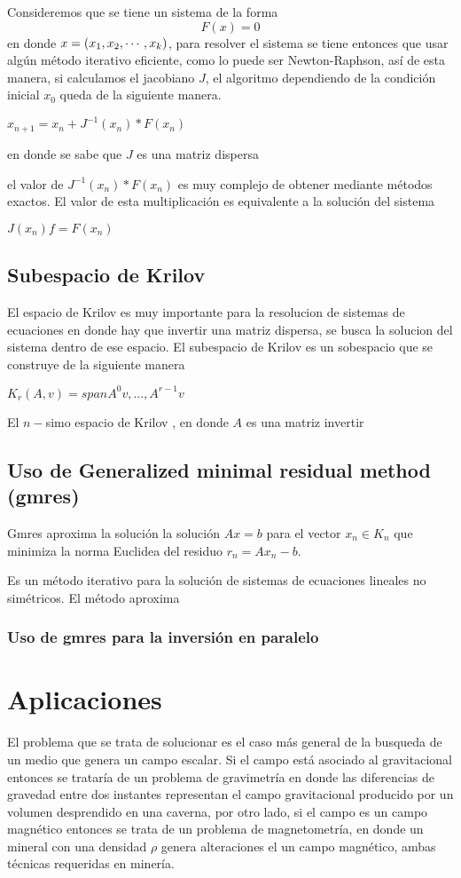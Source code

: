 Consideremos que se tiene un sistema de la forma $$F(x)=0$$ en donde $x
= \left(x_1,x_2,\cdots,x_k\right)$, para resolver el sistema se tiene entonces que usar
algún método iterativo eficiente, como lo puede ser Newton-Raphson,
así de esta manera, si calculamos el jacobiano $J$, el algoritmo
dependiendo de la condición inicial $x_0$ queda de la siguiente
manera.

$x_{n+1}=x_n+J^{-1}(x_n)*F(x_n)$

en donde se sabe que $J$ es una matriz dispersa

el valor de $J^{-1}(x_n)*F(x_n)$ es muy complejo de obtener mediante
métodos exactos. El valor de esta multiplicación es equivalente a la
solución del sistema 

$J(x_n)f=F(x_n)$

\subsection{Subespacio de Krilov}
El espacio de Krilov es muy importante para la resolucion de sistemas de ecuaciones en donde hay que invertir una matriz dispersa, se busca la solucion del sistema dentro de ese espacio.
El subespacio de Krilov es un sobespacio que se construye de la siguiente manera

$K_r(A,v)= span{A^0v, ..., A^{r-1} v}$

El $n-$simo espacio de Krilov , en donde $A$ es una matriz invertir 

\subsection{Uso de Generalized minimal residual method (gmres)}

Gmres aproxima la solución la solución $Ax=b$ para el vector $x_n \in K_n$ que minimiza la norma Euclidea del residuo $r_n = Ax_n-b$. 

Es un método iterativo para la solución de sistemas de ecuaciones lineales no simétricos. El método aproxima 

\subsubsection{Uso de gmres para la inversión en paralelo}





\section{Aplicaciones}

El problema que se trata de solucionar es el caso más general de la
busqueda de un medio que genera un campo escalar. Si el campo está
asociado al gravitacional entonces se trataría de un problema de
gravimetría en donde las diferencias de gravedad entre dos instantes
representan el campo gravitacional producido por un volumen
desprendido en una caverna, por otro lado, si el campo es un campo
magnético entonces se trata de un problema de magnetometría, en donde
un mineral con una densidad $\rho$ genera alteraciones el un campo
magnético, ambas técnicas requeridas en minería.
